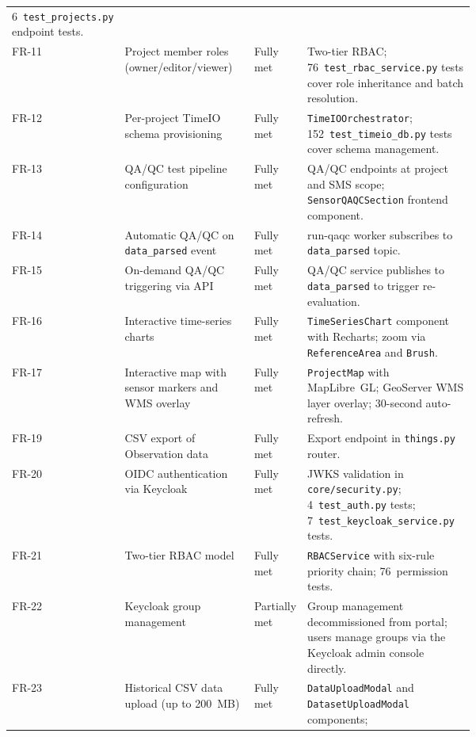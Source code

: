 \begin{landscape}
{\begin{longtable}{l p{0.30\linewidth} l p{0.38\linewidth}}
          6~\texttt{test\_projects.py} endpoint tests. \\[3pt]
  FR-11 & Project member roles (owner/editor/viewer)
        & Fully met
        & Two-tier RBAC; 76~\texttt{test\_rbac\_service.py} tests cover role
          inheritance and batch resolution. \\[3pt]
  FR-12 & Per-project TimeIO schema provisioning
        & Fully met
        & \texttt{TimeIOOrchestrator}; 152~\texttt{test\_timeio\_db.py} tests
          cover schema management. \\[3pt]
  FR-13 & QA/QC test pipeline configuration
        & Fully met
        & QA/QC endpoints at project and SMS scope;
          \texttt{SensorQAQCSection} frontend component. \\[3pt]
  FR-14 & Automatic QA/QC on \texttt{data\_parsed} event
        & Fully met
        & run-qaqc worker subscribes to \texttt{data\_parsed} topic. \\[3pt]
  FR-15 & On-demand QA/QC triggering via API
        & Fully met
        & QA/QC service publishes to \texttt{data\_parsed} to trigger
          re-evaluation. \\[3pt]
  FR-16 & Interactive time-series charts
        & Fully met
        & \texttt{TimeSeriesChart} component with Recharts; zoom via
          \texttt{ReferenceArea} and \texttt{Brush}. \\[3pt]
  FR-17 & Interactive map with sensor markers and WMS overlay
        & Fully met
        & \texttt{ProjectMap} with MapLibre~GL; GeoServer WMS layer overlay;
          30-second auto-refresh. \\[3pt]
  FR-19 & CSV export of Observation data
        & Fully met
        & Export endpoint in \texttt{things.py} router. \\[3pt]
  FR-20 & OIDC authentication via Keycloak
        & Fully met
        & JWKS validation in \texttt{core/security.py}; 4~\texttt{test\_auth.py}
          tests; 7~\texttt{test\_keycloak\_service.py} tests. \\[3pt]
  FR-21 & Two-tier RBAC model
        & Fully met
        & \texttt{RBACService} with six-rule priority chain;
          76~permission tests. \\[3pt]
  FR-22 & Keycloak group management
        & Partially met
        & Group management decommissioned from portal; users manage groups
          via the Keycloak admin console directly. \\[3pt]
  FR-23 & Historical CSV data upload (up to 200~MB)
        & Fully met
        & \texttt{DataUploadModal} and \texttt{DatasetUploadModal} components;

\end{longtable}}
\end{landscape}
